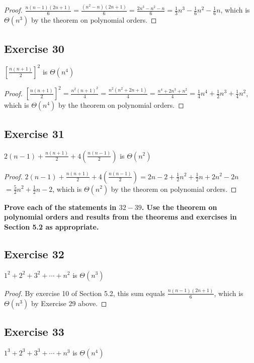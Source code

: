 \documentclass[14pt]{extarticle}
\newcommand{\dps}{\displaystyle}
\newcommand{\cy}{\color{cyan}}
\begin{document}
\begin{proof}
\(\dps \frac{n(n-1)(2n+1)}{6} = \frac{(n^2-n)(2n+1)}{6} = \frac{2n^3-n^2-n}{6} = \frac{1}{3}n^3 - \frac{1}{6}n^2 - 
\frac{1}{6}n\), which is \(\Theta(n^3)\) by the theorem on polynomial orders.
\end{proof}

\subsection{Exercise 30}
\(\dps \left[\frac{n(n+1)}{2}\right]^2\) is \(\Theta(n^4)\)

\begin{proof}
\(\dps \left[\frac{n(n+1)}{2}\right]^2 = \frac{n^2(n+1)^2}{4} = \frac{n^2(n^2+2n+1)}{4} = \frac{n^4+2n^3+n^2}{4} = 
\frac{1}{4}n^4 + \frac{1}{2}n^3 + \frac{1}{4}n^2\), which is \(\Theta(n^4)\) by the theorem on polynomial orders.
\end{proof}

\subsection{Exercise 31}
\(\dps 2(n-1) + \frac{n(n+1)}{2} + 4\left(\frac{n(n-1)}{2}\right)\) is \(\Theta(n^2)\)

\begin{proof}
\(\dps 2(n-1) + \frac{n(n+1)}{2} + 4\left(\frac{n(n-1)}{2}\right) = 2n - 2 + \frac{1}{2}n^2 + \frac{1}{2}n + 2n^2 - 2n\)
\( = \frac{5}{2}n^2 + \frac{1}{2}n - 2\),  which is \(\Theta(n^2)\) by the theorem on polynomial orders.
\end{proof}

{\bf \cy Prove each of the statements in \(32-39\). Use the theorem on polynomial orders and results from the theorems and
exercises in Section 5.2 as appropriate.}

\subsection{Exercise 32}
\(1^2 + 2^2 + 3^2 + \cdots + n^2\) is \(\Theta(n^3)\)

\begin{proof}
By exercise 10 of Section 5.2, this sum equals \(\dps \frac{n(n-1)(2n+1)}{6}\), which is \(\Theta(n^3)\) by Exercise
29 above.
\end{proof}

\subsection{Exercise 33}
\(1^3 + 2^3 + 3^3 + \cdots + n^3\) is \(\Theta(n^4)\)
\end{document}
